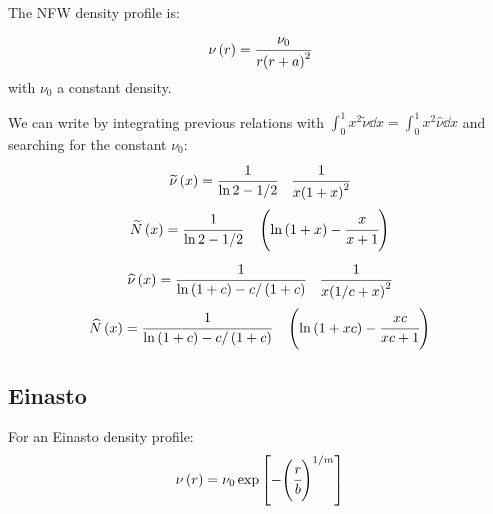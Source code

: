 \subsection{\citet{NFW+97}}

The NFW density profile is:
%
\begin{equation}
    \nu \left(r\right) = \cfrac{\nu_0}{r {\left(r+a\right)}^2}
\end{equation}
%
with $\nu_0$ a constant density.

We can write by integrating previous relations with $\int_0^1
x^2\widetilde\nu\dd x=\int_0^1 x^2\widehat\nu\dd x$  and searching for the
constant $\nu_0$:
%
\begin{equation}
    \widetilde\nu\left(x\right)=\cfrac{1}{\ln2-1/2}
        \quad\cfrac{1}{x{\left(1+x\right)}^2}
\end{equation}
%
\begin{equation}
    \widetilde{N}\left(x\right)=\cfrac{1}{\ln2-1/2}
        \quad\left(\ln\left(1+x\right)-\cfrac{x}{x+1}\right)
\end{equation}
%
\begin{equation}
    \widehat\nu\left(x\right)=
        \cfrac{1}{\ln\left(1+c\right)-c/ \left(1+c\right)}
        \quad\cfrac{1}{x{\left(1/c+x\right)}^2}
\end{equation}
%
\begin{equation}
    \widehat{N}\left(x\right)=
        \cfrac{1}{\ln \left(1+c\right)-c/ \left(1+c\right)}
        \quad\left(\ln\left(1+xc\right)-\cfrac{xc}{xc+1}\right)
\end{equation}

\subsection{Einasto}
\label{sub:einasto}

For an Einasto density profile:
\begin{equation}
    \nu \left(r\right) = \nu_0 \exp
    \left[- {\left(\cfrac{r}{b}\right)}^{1/m}\right]
\end{equation}


